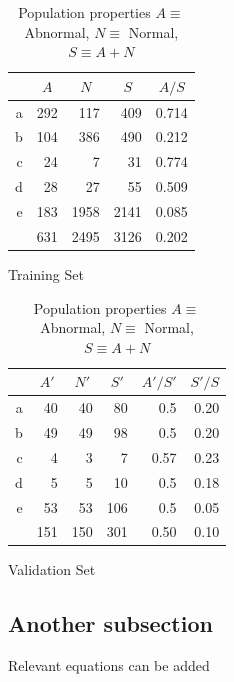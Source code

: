 \documentclass{project-logbook}
\begin{document}
				\begin{table}[ht]
					\centering
						\begin{subtable}{0.48\textwidth}
							\centering
        								\begin{tabular}{*{5}{r}}
									{}  & \multicolumn{1}{c}{$A$} & \multicolumn{1}{c}{$N$} & \multicolumn{1}{c}{$S$} & \multicolumn{1}{c}{$A/S$} \\
									\midrule
									a & 292 & 117   & 409   & 0.714 \\
									b & 104 & 386   & 490   & 0.212 \\
									c & 24  & 7     & 31    & 0.774 \\
									d & 28  & 27    & 55    & 0.509 \\
									e & 183 & 1958  & 2141  & 0.085 \\
									\midrule
									& 631 & 2495 & 3126 & 0.202 \\
								\end{tabular}
							\caption{Training Set}
						\end{subtable}
    						\begin{subtable}{0.48\textwidth}
        							\centering
        								\begin{tabular}{*{6}{r}}
									{}  & \multicolumn{1}{c}{$A'$} & \multicolumn{1}{c}{$N'$} & \multicolumn{1}{c}{$S'$} & \multicolumn{1}{c}{$A'/S'$} & $S'/S$ \\
									\midrule
									a & 40  & 40    & 80    & 0.5   & 0.20 \\
									b & 49  & 49    & 98    & 0.5   & 0.20 \\
									c & 4   & 3     & 7     & 0.57  & 0.23 \\
									d & 5   & 5     & 10    & 0.5   & 0.18 \\
									e & 53  & 53    & 106   & 0.5   & 0.05 \\
									\midrule
									& 151 & 150 & 301 & 0.50 & 0.10 \\
								\end{tabular}
								\caption{Validation Set}
						\end{subtable}

    						\caption{Population properties $A \equiv$ Abnormal, $N\equiv$ Normal, $S\equiv A+N$}
    						\label{tab:populations}
				\end{table}

	\subsection{Another subsection} \label{sub:another_subsection}
		Relevant equations can be added
\end{document}
